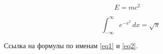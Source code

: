 \begin{equation} \label{eq1}
  E = mc^2
\end{equation}

\begin{equation} \label{eq2}
  \quad \int_{-\infty}^{\infty} e^{-x^2}\,dx = \sqrt{\pi}
\end{equation}

Ссылка на формулы по именам \ref{eq1} и \ref{eq2}.
